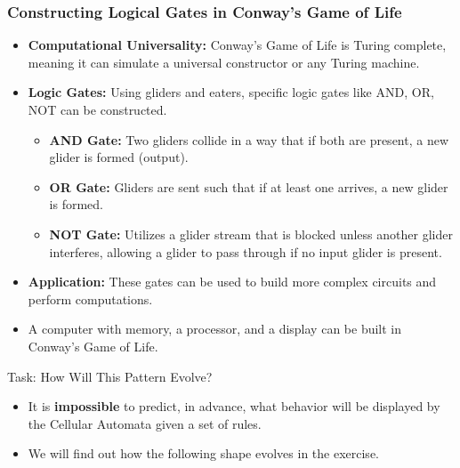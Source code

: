 \begin{frame}
\frametitle{Constructing Logical Gates in Conway's Game of Life}
\begin{itemize}
    \item \textbf{Computational Universality:} Conway's Game of Life is Turing complete, meaning it can simulate a universal constructor or any Turing machine.
    \item \textbf{Logic Gates:} Using gliders and eaters, specific logic gates like AND, OR, NOT can be constructed.
    \begin{itemize}
        \item \textbf{AND Gate:} Two gliders collide in a way that if both are present, a new glider is formed (output).
        \item \textbf{OR Gate:} Gliders are sent such that if at least one arrives, a new glider is formed.
        \item \textbf{NOT Gate:} Utilizes a glider stream that is blocked unless another glider interferes, allowing a glider to pass through if no input glider is present.
    \end{itemize}
    \item \textbf{Application:} These gates can be used to build more complex circuits and perform computations.
    \item A computer with memory, a processor, and a display can be built in Conway's Game of Life.
\end{itemize}
\end{frame}

\begin{frame}{Task: How Will This Pattern Evolve?}
\begin{itemize}
    \item It is \textbf{impossible} to predict, in advance, what behavior will be displayed by the Cellular Automata given a set of rules.
    \item We will find out how the following shape evolves in the exercise.
\end{itemize}
  \vfill
    \begin{center}
    \end{center}
\end{frame}
